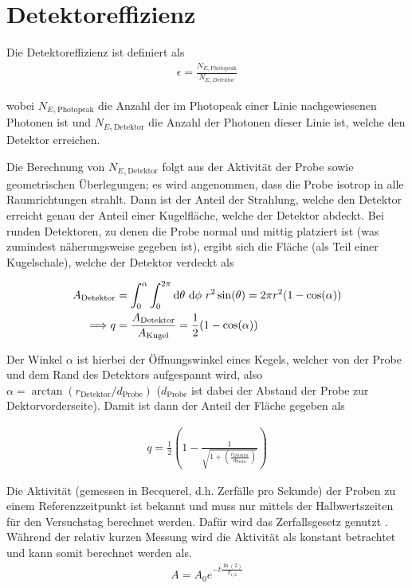 \chapter{Detektoreffizienz}\label{sec:efficiency}

Die Detektoreffizienz ist definiert als
\begin{align}
	\epsilon = \frac{N_{E_\gamma \, \text{Photopeak}}}{N_{E_\gamma \, Detektor}} \label{eq:basic_efficiency}
\end{align}

wobei $N_{E_\gamma \, \text{Photopeak}}$ die Anzahl der im Photopeak einer Linie nachgewiesenen Photonen ist und $N_{E_\gamma \, \text{Detektor}}$ die Anzahl der Photonen dieser Linie ist, welche den Detektor erreichen\cite[6]{521versuchsanleitung}.

Die Berechnung von $N_{E_\gamma \, \text{Detektor}}$ folgt aus der Aktivität der Probe sowie geometrischen Überlegungen; es wird angenommen, dass die Probe isotrop in alle Raumrichtungen strahlt. Dann ist der Anteil der Strahlung, welche den Detektor erreicht genau der Anteil einer Kugelfläche, welche der Detektor abdeckt. Bei runden Detektoren, zu denen die Probe normal und mittig platziert ist (was zumindest näherungsweise gegeben ist), ergibt sich die Fläche (als Teil einer Kugelschale), welche der Detektor verdeckt als

\begin{align}
	A_\text{Detektor} &= \int_0^\alpha \int_0^{2 \pi} \text{d}\theta\text{ } \text{d}\phi\text{ } r^2 \sin(\theta) = 2 \pi r^2 (1 - \cos(\alpha))\\
	\Longrightarrow q &= \frac{A_\text{Detektor}}{A_\text{Kugel}} = \frac12 (1 - \cos(\alpha))
\end{align}

Der Winkel $\alpha$ ist hierbei der Öffnungswinkel eines Kegels, welcher von der Probe und dem Rand des Detektors aufgespannt wird, also $\alpha = \arctan(r_\text{Detektor} / d_\text{Probe})$ ($d_\text{Probe}$ ist dabei der Abstand der Probe zur Dektorvorderseite).
Damit ist dann der Anteil der Fläche gegeben als

\begin{align}
	q = \frac12 (1 - \frac{1}{\sqrt{1 + (\frac{r_\text{Detektor}}{d_\text{Probe}})}})
\end{align}


Die Aktivität (gemessen in Becquerel, d.h. Zerfälle pro Sekunde) der Proben zu einem Referenzzeitpunkt ist bekannt und muss nur mittels der Halbwertszeiten für den Versuchstag berechnet werden.
Dafür wird das Zerfallsgesetz genutzt \cite[10]{leotechniques}. Während der relativ kurzen Messung wird die Aktivität als konstant betrachtet und kann somit berechnet werden als.
\begin{align}
	A = A_0 e^{- t \frac{\ln(2)}{T_{1/2}}}
\end{align}


